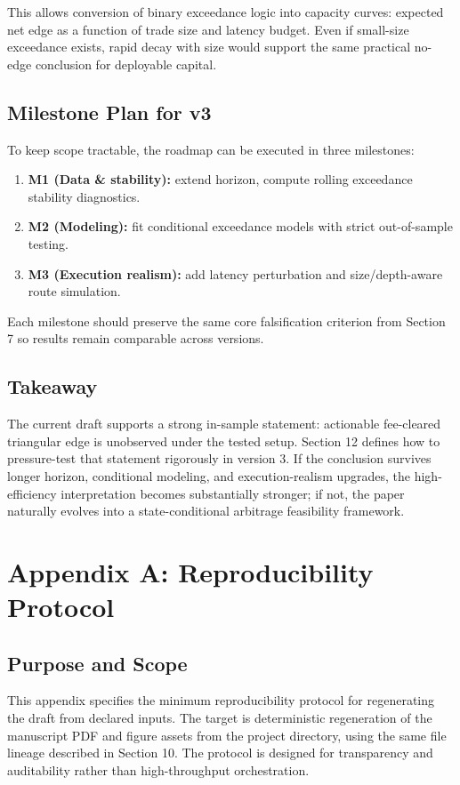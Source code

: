 \documentclass[11pt,a4paper]{article}
\begin{document}
This allows conversion of binary exceedance logic into capacity curves: expected net edge as a function of trade size and latency budget. Even if small-size exceedance exists, rapid decay with size would support the same practical no-edge conclusion for deployable capital.

\subsection{Milestone Plan for v3}
To keep scope tractable, the roadmap can be executed in three milestones:
\begin{enumerate}
    \item \textbf{M1 (Data \& stability):} extend horizon, compute rolling exceedance stability diagnostics.
    \item \textbf{M2 (Modeling):} fit conditional exceedance models with strict out-of-sample testing.
    \item \textbf{M3 (Execution realism):} add latency perturbation and size/depth-aware route simulation.
\end{enumerate}
Each milestone should preserve the same core falsification criterion from Section 7 so results remain comparable across versions.

\subsection{Takeaway}
The current draft supports a strong in-sample statement: actionable fee-cleared triangular edge is unobserved under the tested setup. Section 12 defines how to pressure-test that statement rigorously in version 3. If the conclusion survives longer horizon, conditional modeling, and execution-realism upgrades, the high-efficiency interpretation becomes substantially stronger; if not, the paper naturally evolves into a state-conditional arbitrage feasibility framework.

\appendix
\section{Appendix A: Reproducibility Protocol}
\subsection{Purpose and Scope}
This appendix specifies the minimum reproducibility protocol for regenerating the draft from declared inputs. The target is deterministic regeneration of the manuscript PDF and figure assets from the project directory, using the same file lineage described in Section 10. The protocol is designed for transparency and auditability rather than high-throughput orchestration.
\end{document}
